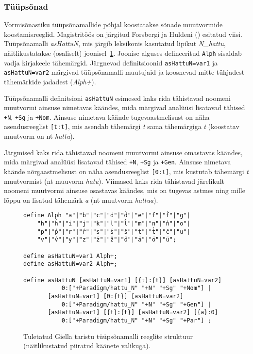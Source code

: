 \documentclass[12pt,a4paper]{article}
\begin{document}
\subsubsection{Tüüpsõnad}
\label{sec:giella-tüüpsõnad}

Vormisõnastiku tüüpsõnamallide põhjal koostatakse sõnade muutvormide koostamis\-reeglid. Magistritöös on järgitud Forsbergi ja Huldeni (\citeyear{forsberg_learning_2016}) esitatud viisi. Tüüp\-sõna\-malli \textit{asHattuN}, mis järgib leksikonis kasutatud lipikut \textit{N\_hattu}, näitlikustatakse (osaliselt) joonisel~\ref{code:giella-paradigms}. Joonise alguses defineeritud \texttt{Alph} sisaldab vadja kirjakeele tähemärgid. Järgnevad definitsioonid \texttt{asHattuN=var1} ja \texttt{asHattuN=var2} märgivad tüüp\-sõna\-malli muutujaid ja koosnevad mitte-tühjadest tähe\-märkide jadadest (\textit{Alph+}).

Tüüp\-sõna\-malli definitsioni \texttt{asHattuN} esimesed kaks rida tähistavad noomeni muutvormi ainsuse nimetavas käändes, mida märgivad analüüsi lisatavad tähised \texttt{+N}, \texttt{+Sg} ja \texttt{+Nom}. Ainsuse nimetava käände tugeva\-astmelisust on näha asendus\-reeglist \texttt{[{t}:{t}]}, mis asendab tähemärgi \textit{t} sama tähemärgiga \textit{t} (koostatav muutvorm on nt \textit{hattu}).

Järgmised kaks rida tähistavad noomeni muutvormi ainsuse omastavas käändes, mida  märgivad analüüsi lisatavad tähised \texttt{+N}, \texttt{+Sg} ja \texttt{+Gen}. Ainsuse nimetava käände nõrga\-astmelisust on näha asendus\-reeglist \texttt{[0:{t}]}, mis kustutab tähemärgi \textit{t} muutvormist (nt muuvorm \textit{hatu}). Viimased kaks rida tähistavad järelikult noomeni muutvormi ainsuse osastavas käändes, mis on tugevas astmes ning mille lõppu on lisatud tähemärk \textit{a} (nt muutvorm \textit{hattua}).

\begin{figure}[H]
  \center
  \begin{verbatim}
define Alph "a"|"b"|"c"|"d"|"d̕"|"e"|"f"|"f̕"|"g"|
    "h"|"h̕"|"i"|"j"|"k"|"l"|"l̕"|"m"|"n"|"n̕"|"o"|
    "p"|"p̕"|"r"|"r̕"|"s"|"s̕"|"š"|"t"|"t̕"|"č"|"u"|
    "v"|"v̕"|"y"|"z"|"z̕"|"ž"|"õ"|"ä"|"ö"|"ü";

define asHattuN=var1 Alph+;
define asHattuN=var2 Alph+;

define asHattuN [asHattuN=var1] [{t}:{t}] [asHattuN=var2]
           0:["+Paradigm/hattu_N" "+N" "+Sg" "+Nom"] |
       [asHattuN=var1] [0:{t}] [asHattuN=var2]
           0:["+Paradigm/hattu_N" "+N" "+Sg" "+Gen"] |
       [asHattuN=var1] [{t}:{t}] [asHattuN=var2] [{a}:0]
           0:["+Paradigm/hattu_N" "+N" "+Sg" "+Par"] ;
\end{verbatim}
\caption{Tuletatud Giella taristu tüüpsõnamalli reeglite struktuur (näitlikustatud piiratud käänete valikuga).
  \label{code:giella-paradigms}}
\end{figure}
\end{document}
